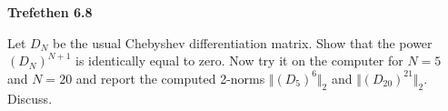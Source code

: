 \textbf{Trefethen 6.8}

Let $D_N$ be the usual Chebyshev differentiation matrix. Show that the power $(D_N)^{N+1}$ is identically equal to zero.
Now try it on the computer for $N = 5$ and $N = 20$ and report the computed 2-norms $\Vert (D_5)^{6} \Vert_2$ and 
$\Vert (D_{20})^{21} \Vert_2$. Discuss.

\begin{solution}
  \ \\
  \vfill
\end{solution}